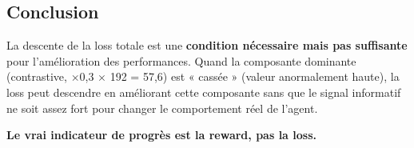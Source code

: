 \documentclass[11pt,a4paper]{article}
\begin{document}
\subsection{Conclusion}

La descente de la loss totale est une \textbf{condition nécessaire mais pas suffisante} pour l'amélioration des performances. Quand la composante dominante (contrastive, $\times$0{,}3 $\times$ 192 = 57{,}6) est « cassée » (valeur anormalement haute), la loss peut descendre en améliorant cette composante sans que le signal informatif ne soit assez fort pour changer le comportement réel de l'agent.

\textbf{Le vrai indicateur de progrès est la reward, pas la loss.}
\end{document}
